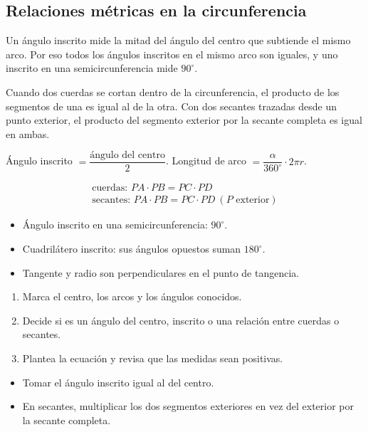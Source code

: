 \documentclass[10pt,a4paper,twocolumn]{article}
\begin{document}
\subsection{Relaciones métricas en la circunferencia}

Un ángulo inscrito mide la mitad del ángulo del centro que subtiende el mismo arco. Por eso todos los ángulos inscritos en el mismo arco son iguales, y uno inscrito en una semicircunferencia mide $90^\circ$.

Cuando dos cuerdas se cortan dentro de la circunferencia, el producto de los segmentos de una es igual al de la otra. Con dos secantes trazadas desde un punto exterior, el producto del segmento exterior por la secante completa es igual en ambas.

\begin{ley}[Relaciones]
Ángulo inscrito $=\dfrac{\text{ángulo del centro}}{2}$. Longitud de arco $=\dfrac{\alpha}{360^\circ}\cdot 2\pi r$.

\begin{gather*}
\text{cuerdas: } PA\cdot PB=PC\cdot PD \\
\text{secantes: } PA\cdot PB=PC\cdot PD\ (P \text{ exterior})
\end{gather*}
\end{ley}

\begin{ideasclave}
\begin{itemize}
  \item Ángulo inscrito en una semicircunferencia: $90^\circ$.
  \item Cuadrilátero inscrito: sus ángulos opuestos suman $180^\circ$.
  \item Tangente y radio son perpendiculares en el punto de tangencia.
\end{itemize}
\end{ideasclave}

\begin{metodo}
\begin{enumerate}
  \item Marca el centro, los arcos y los ángulos conocidos.
  \item Decide si es un ángulo del centro, inscrito o una relación entre cuerdas o secantes.
  \item Plantea la ecuación y revisa que las medidas sean positivas.
\end{enumerate}
\end{metodo}

\begin{errorfrecuente}
\begin{itemize}
  \item Tomar el ángulo inscrito igual al del centro.
  \item En secantes, multiplicar los dos segmentos exteriores en vez del exterior por la secante completa.
\end{itemize}
\end{errorfrecuente}
\end{document}
